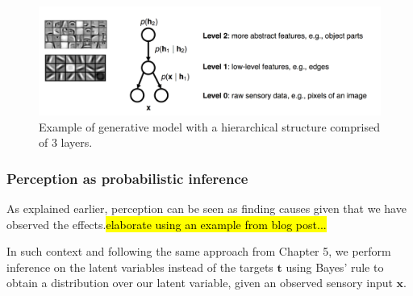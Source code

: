 \documentclass[main]{subfiles}
\begin{document}
    \begin{figure}[H]
            	\centering
            	\includegraphics[width=1\linewidth]{06_PredictionErrorsDuringPerceptionAndLearning/figures/hierarchical_models.png}
            	\caption{Example of generative model with a hierarchical structure comprised of 3 layers.} 
            	\label{fig:hierar_model}
    \end{figure}

\subsubsection{Perception as probabilistic inference}
As explained earlier, perception can be seen as finding causes given that we have observed the effects.\hl{elaborate using an example from blog post...}

In such context and following the same approach from Chapter 5, we perform inference on the latent variables instead of the targets $\bm{t}$ using Bayes' rule to obtain a distribution over our latent variable, given an observed sensory input $\bm{x}$.
\end{document}
